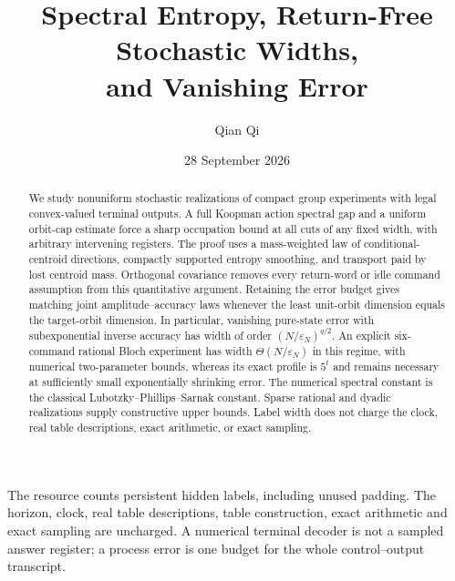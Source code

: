\documentclass[11pt]{amsart}
\title[Return-free stochastic widths]{Spectral Entropy, Return-Free Stochastic Widths,\\and Vanishing Error}
\author{Qian Qi}
\date{28 September 2026}
\numberwithin{equation}{section}
\theoremstyle{definition}\newtheorem{definition}[theorem]{Definition}
\theoremstyle{remark}\newtheorem{remark}[theorem]{Remark}
\begin{document}
\begin{abstract}
We study nonuniform stochastic realizations of compact group experiments
with legal convex-valued terminal outputs. A full Koopman action spectral
gap and a uniform orbit-cap estimate force a sharp occupation bound at
all cuts of any fixed width, with arbitrary intervening registers. The
proof uses a mass-weighted law of conditional-centroid directions,
compactly supported entropy smoothing, and transport paid by lost
centroid mass. Orthogonal covariance removes every return-word or idle
command assumption from this quantitative argument. Retaining the error
budget gives matching joint amplitude--accuracy laws whenever the least
unit-orbit dimension equals the target-orbit dimension. In particular,
vanishing pure-state error with subexponential inverse accuracy has
width of order $(N/\varepsilon_N)^{q/2}$. An explicit six-command rational
Bloch experiment has width $\Theta(N/\varepsilon_N)$ in this regime,
with numerical two-parameter bounds, whereas its exact profile is $5^t$
and remains necessary at sufficiently small exponentially shrinking error.
The numerical spectral constant is the classical Lubotzky--Phillips--Sarnak
constant. Sparse rational and dyadic realizations supply constructive
upper bounds. Label width does not charge the clock, real table
descriptions, exact arithmetic, or exact sampling.
\end{abstract}
\maketitle
\noindent The resource counts persistent hidden labels, including unused
padding. The horizon, clock, real table descriptions, table construction,
exact arithmetic and exact sampling are uncharged. A numerical terminal
decoder is not a sampled answer register; a process error is one budget
for the whole control--output transcript.


















\end{document}
